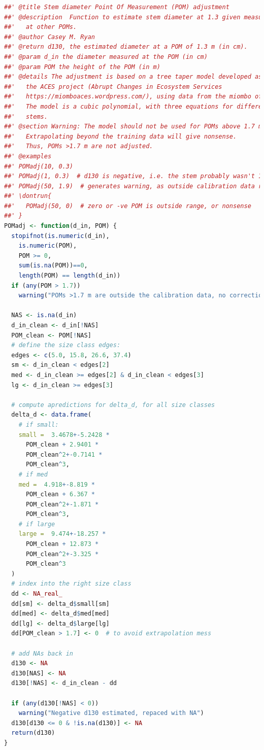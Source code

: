 \documentclass[11pt,a4paper]{article}
\begin{document}
\begin{lstlisting}[language=R]
##' @title Stem diameter Point Of Measurement (POM) adjustment
##' @description  Function to estimate stem diameter at 1.3 given measurements 
##'   at other POMs.
##' @author Casey M. Ryan
##' @return d130, the estimated diameter at a POM of 1.3 m (in cm). 
##' @param d_in the diameter measured at the POM (in cm)
##' @param POM the height of the POM (in m)
##' @details The adjustment is based on a tree taper model developed as part of 
##'   the ACES project (Abrupt Changes in Ecosystem Services 
##'   https://miomboaces.wordpress.com/), using data from the miombo of Niassa. 
##'   The model is a cubic polynomial, with three equations for different sized 
##'   stems. 
##' @section Warning: The model should not be used for POMs above 1.7 m. 
##'   Extrapolating beyond the training data will give nonsense. 
##'   Thus, POMs >1.7 m are not adjusted.
##' @examples
##' POMadj(10, 0.3)
##' POMadj(1, 0.3)  # d130 is negative, i.e. the stem probably wasn't 1.3 m tall
##' POMadj(50, 1.9)  # generates warning, as outside calibration data range
##' \dontrun{
##'   POMadj(50, 0)  # zero or -ve POM is outside range, or nonsense
##' }
POMadj <- function(d_in, POM) {
  stopifnot(is.numeric(d_in),
    is.numeric(POM),
    POM >= 0,
    sum(is.na(POM))==0,
    length(POM) == length(d_in))
  if (any(POM > 1.7))
    warning("POMs >1.7 m are outside the calibration data, no correction applied")
  
  NAS <- is.na(d_in)
  d_in_clean <- d_in[!NAS]
  POM_clean <- POM[!NAS]
  # define the size class edges:
  edges <- c(5.0, 15.8, 26.6, 37.4)
  sm <- d_in_clean < edges[2]
  med <- d_in_clean >= edges[2] & d_in_clean < edges[3]
  lg <- d_in_clean >= edges[3]
  
  # compute apredictions for delta_d, for all size classes
  delta_d <- data.frame(
    # if small:
    small =  3.4678+-5.2428 * 
   	  POM_clean + 2.9401 * 
      POM_clean^2+-0.7141 * 
      POM_clean^3,
    # if med
    med =  4.918+-8.819 * 
      POM_clean + 6.367 * 
      POM_clean^2+-1.871 * 
      POM_clean^3,
    # if large
    large =  9.474+-18.257 * 
      POM_clean + 12.873 * 
      POM_clean^2+-3.325 * 
      POM_clean^3
  )
  # index into the right size class
  dd <- NA_real_
  dd[sm] <- delta_d$small[sm]
  dd[med] <- delta_d$med[med]
  dd[lg] <- delta_d$large[lg]
  dd[POM_clean > 1.7] <- 0  # to avoid extrapolation mess
  
  # add NAs back in
  d130 <- NA
  d130[NAS] <- NA
  d130[!NAS] <- d_in_clean - dd
  
  if (any(d130[!NAS] < 0))
    warning("Negative d130 estimated, repaced with NA")
  d130[d130 <= 0 & !is.na(d130)] <- NA
  return(d130)
}
\end{lstlisting}
\end{document}
